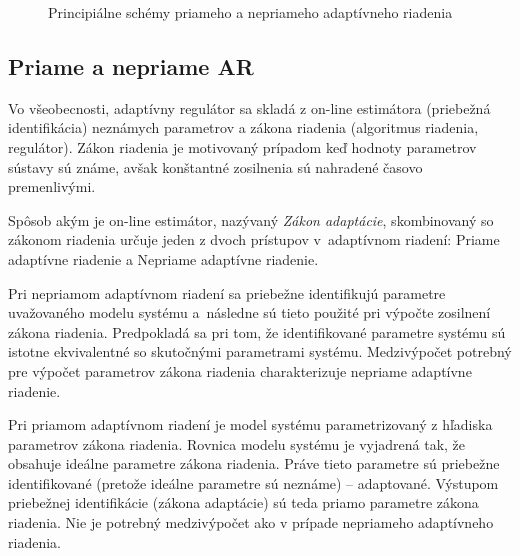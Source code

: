 \documentclass[a4paper, 10pt, ]{article}
\begin{document}
\begin{figure}[!t]
	\centering

	\vspace{-3mm}

	\caption{Principiálne schémy priameho a nepriameho adaptívneho riadenia}
	\label{Principiálne schémy priameho a nepriameho adaptívneho riadenia}
\end{figure}



\subsection{Priame a nepriame AR}

Vo všeobecnosti, adaptívny regulátor sa skladá z on-line estimátora (priebežná identifikácia) neznámych parametrov a zákona riadenia (algoritmus riadenia, regulátor). Zákon riadenia je motivovaný prípadom keď hodnoty parametrov sústavy sú známe, avšak konštantné zosilnenia sú nahradené časovo premenlivými.

Spôsob akým je on-line estimátor, nazývaný \emph{Zákon adaptácie}, skombinovaný so zákonom riadenia určuje jeden z dvoch prístupov v~adaptívnom riadení: Priame adaptívne riadenie a Nepriame adaptívne riadenie.

Pri nepriamom adaptívnom riadení sa priebežne identifikujú parametre uvažovaného modelu systému a~následne sú tieto použité pri výpočte zosilnení zákona riadenia. Predpokladá sa pri tom, že identifikované parametre systému sú istotne ekvivalentné so skutočnými parametrami systému. Medzivýpočet potrebný pre výpočet parametrov zákona riadenia charakterizuje nepriame adaptívne riadenie.

Pri priamom adaptívnom riadení je model systému parametrizovaný z hľadiska parametrov zákona riadenia. Rovnica modelu systému je vyjadrená tak, že obsahuje ideálne parametre zákona riadenia. Práve tieto parametre sú priebežne identifikované (pretože ideálne parametre sú neznáme) -- adaptované. Výstupom priebežnej identifikácie (zákona adaptácie) sú teda priamo parametre zákona riadenia. Nie je potrebný medzivýpočet ako v prípade nepriameho adaptívneho riadenia.





\printbibliography[title={Literatúra}]
\end{document}

